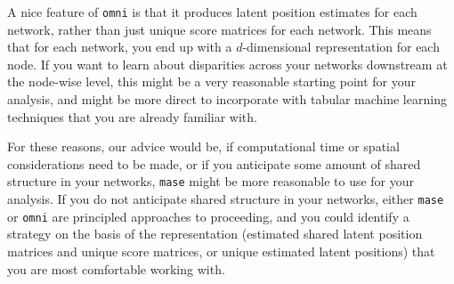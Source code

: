 A nice feature of \texttt{omni} is that it produces latent position estimates for each network, rather than just unique score matrices for each network. This means that for each network, you end up with a $d$-dimensional representation for each node. If you want to learn about disparities across your networks downstream at the node-wise level, this might be a very reasonable starting point for your analysis, and might be more direct to incorporate with tabular machine learning techniques that you are already familiar with.

For these reasons, our advice would be, if computational time or spatial considerations need to be made, or if you anticipate some amount of shared structure in your networks, \texttt{mase} might be more reasonable to use for your analysis. If you do not anticipate shared structure in your networks, either \texttt{mase} or \texttt{omni} are principled approaches to proceeding, and you could identify a strategy on the basis of the representation (estimated shared latent position matrices and unique score matrices, or unique estimated latent positions) that you are most comfortable working with.

\newpage